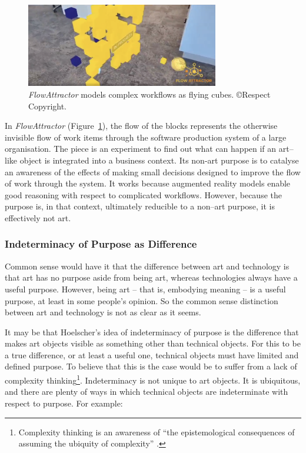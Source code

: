 \documentclass[letter:wpaper]{article}
\begin{document}
    \begin{figure}[h]
        \includegraphics[width=3.31in]{flow-attractor.png}
        \caption{\emph{FlowAttractor} models complex workflows as flying cubes. \copyright Respect Copyright.}
        \label{fig:flow-attractor}
    \end{figure}

    In \emph{FlowAttractor} (Figure~\ref{fig:flow-attractor}), the flow of the blocks represents the otherwise invisible flow of work items through the software production system of a large organisation. The piece is an experiment to find out what can happen if an art–like object is integrated into a business context. Its non-art purpose is to catalyse an awareness of the effects of making small decisions designed to improve the flow of work through the system. It works because augmented reality models enable good reasoning with respect to complicated workflows. However, because the purpose is, in that context, ultimately reducible to a non–art purpose, it is effectively not art.

    \subsubsection{Indeterminacy of Purpose as Difference}

    Common sense would have it that the difference between art and technology is that art has no purpose aside from being art, whereas technologies always have a useful purpose. However, being art – that is, embodying meaning – is a useful purpose, at least in some people's opinion. So the common sense distinction between art and technology is not as clear as it seems.

    It may be that Hoelscher's idea of indeterminacy of purpose is the difference that makes art objects visible as something other than technical objects. For this to be a true difference, or at least a useful one, technical objects must have limited and defined purpose. To believe that this is the case would be to suffer from a lack of complexity thinking\footnote{
        Complexity thinking is an awareness of “the epistemological consequences of assuming the ubiquity of complexity” \citep{CilliersRichardsonCmplxtyScnc2001}.
    }. Indeterminacy is not unique to art objects. It is ubiquitous, and there are plenty of ways in which technical objects are indeterminate with respect to purpose. For example:
\end{document}
